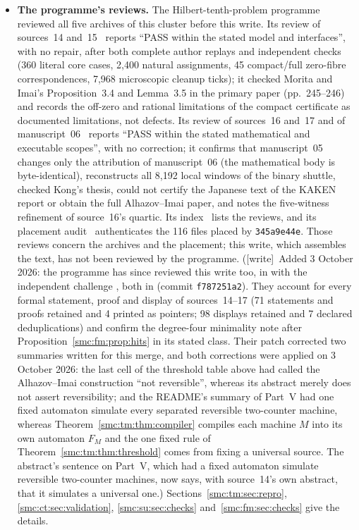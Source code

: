 \documentclass[11pt,letterpaper]{article}
\numberwithin{equation}{section}
\theoremstyle{definition}
\theoremstyle{remark}
\newcommand{\wtag}{\textup{[write]}}
\begin{document}
\begin{itemize}
\item \textbf{The programme's reviews.} The Hilbert-tenth-problem programme reviewed all five archives of this cluster before this write. Its review of sources~14 and~15~\cite{reviewthreemass} reports ``PASS within the stated model and interfaces'', with no repair, after both complete author replays and independent checks (360 literal core cases, 2,400 natural assignments, 45 compact/full zero-fibre correspondences, 7,968 microscopic cleanup ticks); it checked Morita and Imai's Proposition~3.4 and Lemma~3.5 in the primary paper (pp.~245--246) and records the off-zero and rational limitations of the compact certificate as documented limitations, not defects. Its review of sources~16 and~17 and of manuscript~06~\cite{reviewlowmass} reports ``PASS within the stated mathematical and executable scopes'', with no correction; it confirms that manuscript~05 changes only the attribution of manuscript~06 (the mathematical body is byte-identical), reconstructs all 8,192 local windows of the binary shuttle, checked Kong's thesis, could not certify the Japanese text of the KAKEN report or obtain the full Alhazov--Imai paper, and notes the five-witness refinement of source~16's quartic. Its index~\cite{reviewindexeighty} lists the reviews, and its placement audit~\cite{reviewmassplace} authenticates the 116 files placed by \texttt{345a9e44e}. Those reviews concern the archives and the placement; this write, which assembles the text, has not been reviewed by the programme. (\wtag\ Added 3 October 2026: the programme has since reviewed this write too, in  with the independent challenge , both in  (commit \texttt{f787251a2}). They account for every formal statement, proof and display of sources~14--17 (71 statements and proofs retained and 4 printed as pointers; 98 displays retained and 7 declared deduplications) and confirm the degree-four minimality note after Proposition~\ref{smc:fm:prop:hits} in its stated class. Their patch  corrected two summaries written for this merge, and both corrections were applied on 3 October 2026: the last cell of the threshold table above had called the Alhazov--Imai construction ``not reversible'', whereas its abstract merely does not assert reversibility; and the README's summary of Part~V had one fixed automaton simulate every separated reversible two-counter machine, whereas Theorem~\ref{smc:tm:thm:compiler} compiles each machine $M$ into its own automaton $F_M$ and the one fixed rule of Theorem~\ref{smc:tm:thm:threshold} comes from fixing a universal source. The abstract's sentence on Part~V, which had a fixed automaton simulate reversible two-counter machines, now says, with source~14's own abstract, that it simulates a universal one.) Sections~\ref{smc:tm:sec:repro}, \ref{smc:ct:sec:validation}, \ref{smc:su:sec:checks} and~\ref{smc:fm:sec:checks} give the details.

\end{itemize}
\end{document}

